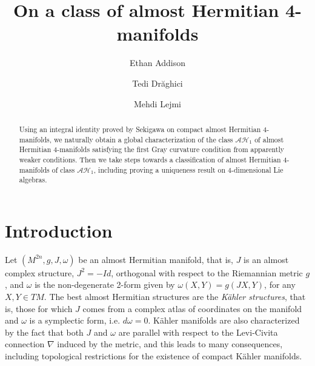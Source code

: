 \documentclass{amsart}
\begin{document}
\title{On a class of almost Hermitian 4-manifolds}

\author{Ethan Addison}
\address{Department of Mathematics, Texas State University, San Marcos, TX 78666-4684, USA}

\author{Tedi Dr\u{a}ghici} 
\address{Department of Mathematics and Statistics, Florida International University, Miami, FL 33199, USA}

\author{Mehdi Lejmi}
\address{Department of Mathematics, Bronx Community College of CUNY, Bronx, NY 10453, USA.}

%
\begin{abstract} Using an integral identity proved by Sekigawa \cite{Sek87} on compact almost Hermitian 4-manifolds, we naturally obtain a global characterization of the class $\mathcal{AH}_1$ of almost Hermitian 4-manifolds satisfying the first Gray curvature condition from apparently weaker conditions. Then we take steps towards a classification of almost Hermitian 4-manifolds of class $\mathcal{AH}_1$, including proving a uniqueness result on 4-dimensional Lie algebras.
\end{abstract}

\maketitle

\section{Introduction} 
Let $(M^{2n}, g, J, \omega)$ be an almost Hermitian manifold, that is, $J$ is an almost complex structure, $J^2 = - Id$, orthogonal with respect to the Riemannian metric $g$, and $\omega$ is the non-degenerate 2-form given by $\omega(X,Y) = g(JX,Y)$, for any $X,Y \in TM$. 
The best almost Hermitian structures are the {\it K\"ahler structures}, that is, those for which $J$ comes from a complex atlas of coordinates on the manifold and $\omega$ is a symplectic form, i.e. $d\omega = 0$. 
K\"ahler manifolds are also characterized by the fact that both $J$ and $\omega$ are parallel with respect to the Levi-Civita connection $\nabla$ induced by the metric, and this leads to many consequences, including topological restrictions for the existence of compact K\"ahler manifolds.
\end{document}
